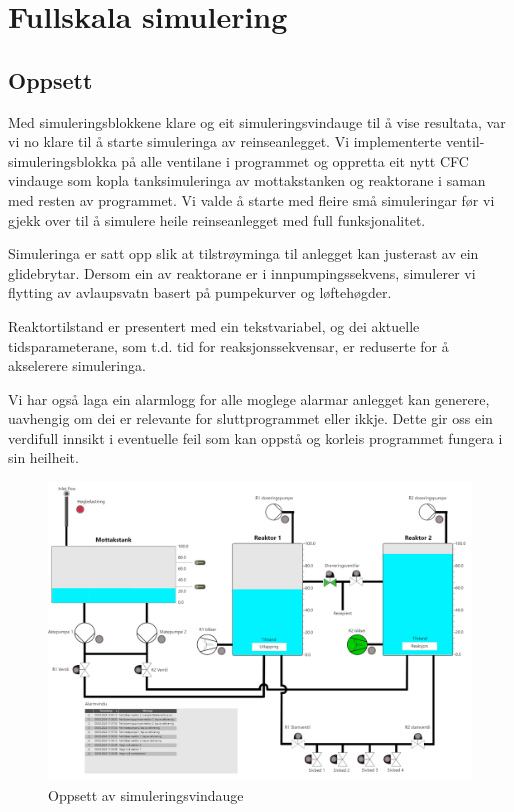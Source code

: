 \section{Fullskala simulering}
\subsection{Oppsett}
Med simuleringsblokkene klare og eit simuleringsvindauge til å vise resultata, var vi
no klare til å starte simuleringa av reinseanlegget.
Vi implementerte ventil-simuleringsblokka på alle ventilane i programmet og oppretta eit
nytt \gls{CFC} vindauge som kopla tanksimuleringa av mottakstanken og reaktorane i saman med resten av
programmet. Vi valde å starte med fleire små simuleringar før vi gjekk over til å simulere heile reinseanlegget med full funksjonalitet.

Simuleringa er satt opp slik at tilstrøyminga til anlegget kan justerast av ein glidebrytar.
Dersom ein av reaktorane er i innpumpingssekvens, simulerer vi flytting av avlaupsvatn
basert på pumpekurver og løftehøgder.

Reaktortilstand er presentert med ein tekstvariabel, og
dei aktuelle tidsparameterane, som t.d. tid for reaksjonssekvensar,
er reduserte for å akselerere simuleringa.

Vi har også laga ein alarmlogg for alle moglege alarmar anlegget kan generere, 
uavhengig om dei er relevante for sluttprogrammet eller ikkje.
Dette gir oss ein verdifull innsikt i eventuelle feil som kan oppstå og korleis programmet fungera i sin heilheit.

\thispagestyle{fancy}
\begin{figure}[htbp]
    \centering
    \includegraphics[scale=0.45]{Bilder/Simuleringsbilde.png}
    \caption{Oppsett av simuleringsvindauge}\label{fig:Simulering}
\end{figure}

